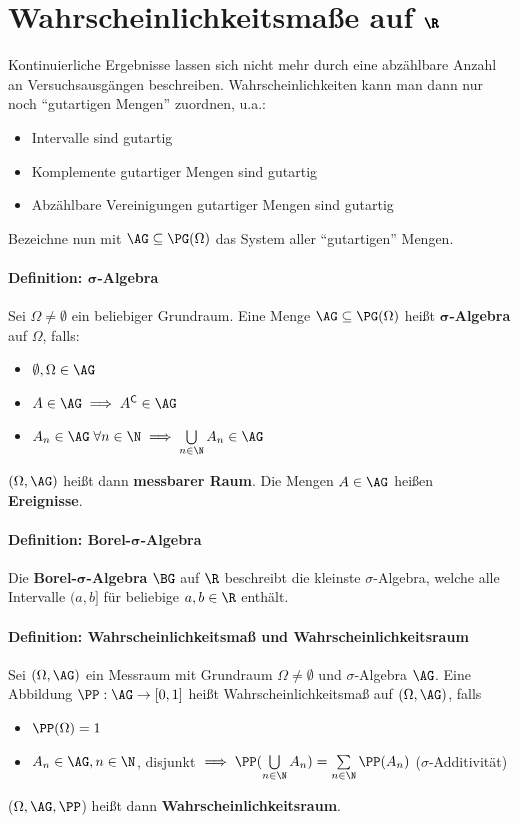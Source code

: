 \section{Wahrscheinlichkeitsmaße auf $\pmb{\R}$}
Kontinuierliche Ergebnisse lassen sich nicht mehr durch eine abzählbare Anzahl an Versuchsausgängen beschreiben.
Wahrscheinlichkeiten kann man dann nur noch \enquote{gutartigen Mengen} zuordnen, u.a.:
\begin{itemize}
	\item Intervalle sind gutartig
	\item Komplemente gutartiger Mengen sind gutartig
	\item Abzählbare Vereinigungen gutartiger Mengen sind gutartig
\end{itemize}
Bezeichne nun mit $\AG\subseteq\PG(\Omega)$ das System aller \enquote{gutartigen} Mengen.

\paragraph{Definition: $\boldsymbol{\sigma}$-Algebra}
Sei $\Omega\neq\emptyset$ ein beliebiger Grundraum. Eine Menge $\AG\subseteq\PG(\Omega)$ heißt $\boldsymbol{\sigma}$\textbf{-Algebra} auf $\Omega$, falls:
\begin{itemize}
	\item $\emptyset,\Omega\in\AG$
	\item $A\in\AG\implies A^{\mathsf{C}}\in\AG$
	\item $A_n\in\AG\;\forall n\in\N\implies\bigcup\limits_{n\in\N}A_n\in\AG$
\end{itemize}
$(\Omega,\AG)$ heißt dann \textbf{messbarer Raum}.
Die Mengen $A\in\AG$ heißen \textbf{Ereignisse}.

\paragraph{Definition: Borel-$\boldsymbol{\sigma}$-Algebra}
Die \textbf{Borel-$\boldsymbol{\sigma}$-Algebra} $\BG$ auf $\R$ beschreibt die kleinste $\sigma$-Algebra, welche alle Intervalle $(a,b]$ für beliebige $a,b\in\R$ enthält.

\paragraph{Definition: Wahrscheinlichkeitsmaß und Wahrscheinlichkeitsraum}
Sei $(\Omega,\AG)$ ein Messraum mit Grundraum $\Omega\neq\emptyset$ und $\sigma$-Algebra $\AG$.
Eine Abbildung $\PP:\AG\rightarrow[0,1]$ heißt Wahrscheinlichkeitsmaß auf $(\Omega,\AG)$, falls
\begin{itemize}
	\item $\PP(\Omega)=1$
	\item $A_n\in\AG,n\in\N$, disjunkt $\implies\PP(\bigcup\limits_{n\in\N}A_n)=\sum\limits_{n\in\N}\PP(A_n)$ \qquad($\sigma$-Additivität)
\end{itemize}
($\Omega,\AG,\PP$) heißt dann \textbf{Wahrscheinlichkeitsraum}.

